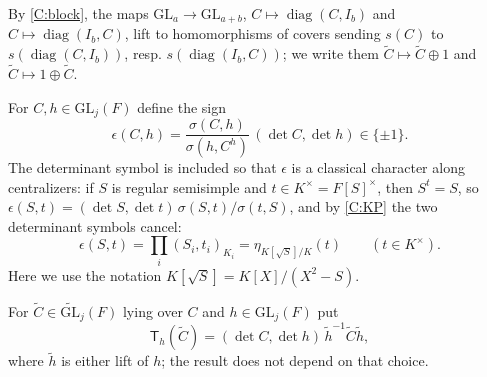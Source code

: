 \documentclass[11pt,oneside,notitlepage]{book}
\numberwithin{equation}{section}
\theoremstyle{plain}
\theoremstyle{definition}
\newcommand{\GL}{\mathrm{GL}}
\newcommand{\tGL}{\widetilde{\GL}}
\newcommand{\diag}{\operatorname{diag}}
\newcommand{\hil}[2]{(#1,#2)}
\newcommand{\T}{\mathsf{T}}
\begin{document}
By \ref{C:block}, the maps $\GL_a\to\GL_{a+b}$, $C\mapsto\diag(C,I_b)$ and $C\mapsto \diag(I_b,C)$, lift to homomorphisms of covers sending $s(C)$ to $s(\diag(C,I_b))$, resp. $s(\diag(I_b,C))$; we write them $\tilde C\mapsto \tilde C\oplus 1$ and $\tilde C\mapsto 1\oplus\tilde C$.

For $C,h\in\GL_j(F)$ define the sign
\begin{equation}\label{eq:eps}
	\epsilon(C,h)=\frac{\sigma(C,h)}{\sigma(h,C^h)}\,\hil{\det C}{\det h}\in\{\pm1\}.
\end{equation}
The determinant symbol is included so that $\epsilon$ is a classical character along centralizers: if $S$ is regular semisimple and $t\in K^\times=F[S]^\times$, then $S^t=S$, so $\epsilon(S,t)=\hil{\det S}{\det t}\,\sigma(S,t)/\sigma(t,S)$, and by \ref{C:KP} the two determinant symbols cancel:
\begin{equation}\label{eq:eps-centralizer}
	\epsilon(S,t)=\prod_i\hil{S_i}{t_i}_{K_i}=\eta_{K[\sqrt S]/K}(t)\qquad(t\in K^\times).
\end{equation}
Here we use the notation $K[\sqrt S]=K[X]/(X^2-S)$.

For $\tilde C\in\tGL_j(F)$ lying over $C$ and $h\in \GL_j(F)$ put
\begin{equation}\label{eq:Taction}
	\T_h(\tilde C)=\hil{\det C}{\det h}\,\tilde h^{-1}\tilde C\tilde h,
\end{equation}
where $\tilde h$ is either lift of $h$; the result does not depend on that choice.
\end{document}
